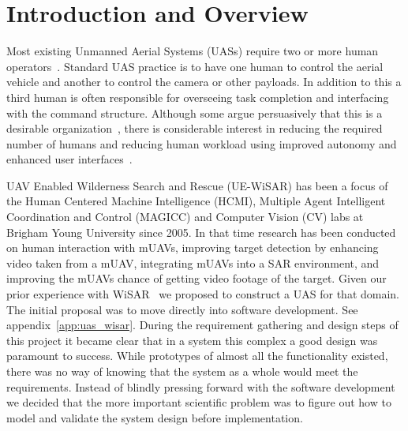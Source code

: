 \chapter{Introduction and Overview}

Most existing Unmanned Aerial Systems (UASs) require two or more human operators~\cite{GoodrichMorse2008,MurphyStoverPrattGriffin2006}. Standard UAS practice is to have one human to control the aerial vehicle and another to control the camera or other payloads. In addition to this a third human is often responsible for overseeing task completion and interfacing with the command structure. Although some argue persuasively that this is a desirable organization~\cite{MurphyBurke2010}, there is considerable interest in reducing the required number of humans and reducing human workload using improved autonomy and enhanced user interfaces~\cite{Cummings2007,MitchellCummings2005,goodrich2010fanout}.

UAV Enabled Wilderness Search and Rescue (UE-WiSAR) has been a focus of the Human
Centered Machine Intelligence (HCMI), Multiple Agent Intelligent Coordination and Control (MAGICC) and Computer Vision (CV) labs at Brigham Young University since 2005.  In that time research has been conducted on human interaction with mUAVs, improving target detection by enhancing video taken from a mUAV, integrating mUAVs into a SAR environment,
and improving the mUAVs chance of getting video footage of the target.   Given our prior experience with WiSAR~\cite{goodrich2009towards} we proposed to construct a UAS for that domain.  The initial proposal was to move directly into software development.  See appendix~\ref{app:uas_wisar}.  During the requirement gathering and design steps of this project it became clear that in a system this complex a good design was paramount to success.  While prototypes of almost all the functionality existed, there was no way of knowing that the system as a whole would meet the requirements.  Instead of blindly pressing forward with the software development we decided that the more important scientific problem was to figure out how to model and validate the system design before implementation.

